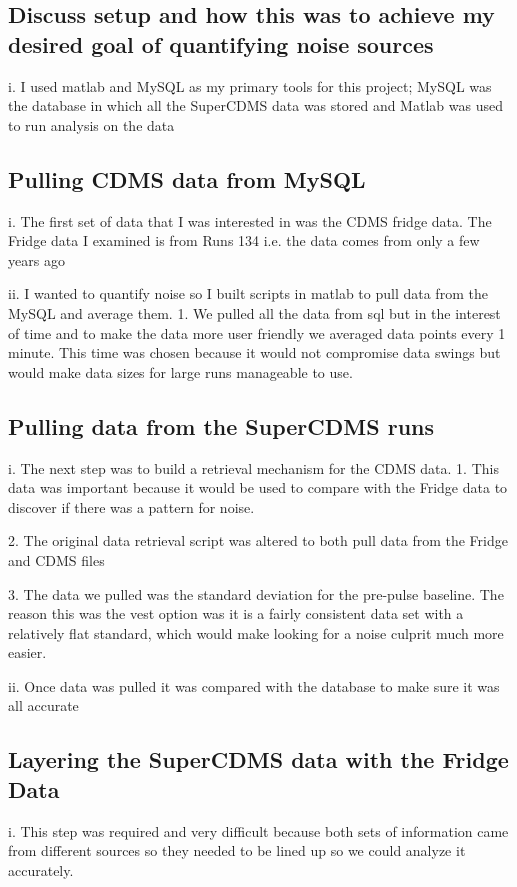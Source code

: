 \subsection{Discuss setup and how this was to achieve my desired goal of quantifying noise sources}
i.	I used matlab and MySQL as my primary tools for this project; MySQL was the database in which all the SuperCDMS data was stored and Matlab was used to run analysis on the data

\subsection{Pulling CDMS data from MySQL}
i.	The first set of data that I was interested in was the CDMS fridge data. The Fridge data I examined is from Runs 134 i.e. the data comes from only a few years ago

ii.	I wanted to quantify noise so I built scripts in matlab to pull data from the MySQL and average them.
1.	We pulled all the data from sql but in the interest of time and to make the data more user friendly we averaged data points every 1 minute. This time was chosen because it would not compromise data swings but would make data sizes for large runs manageable to use. 

\subsection{Pulling data from the SuperCDMS runs}
i.	The next step was to build a retrieval mechanism for the CDMS data. 
1.	This data was important because it would be used to compare with the Fridge data to discover if there was a pattern for noise.

2.	The original data retrieval script was altered to both pull data from the Fridge and CDMS files

3.	The data we pulled was the standard deviation for the pre-pulse baseline. The reason this was the vest option was it is a fairly consistent data set with a relatively flat standard, which would make looking for a noise culprit much more easier. 

ii.	Once data was pulled it was compared with the database to make sure it was all accurate

\subsection{Layering the SuperCDMS data with the Fridge Data}
i.	This step was required and very difficult because both sets of information came from different sources so they needed to be lined up so we could analyze it accurately. 

